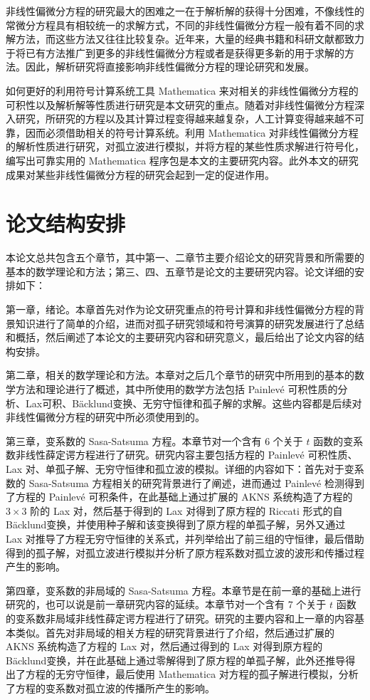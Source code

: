 非线性偏微分方程的研究最大的困难之一在于解析解的获得十分困难，不像线性的常微分方程具有相较统一的求解方式，不同的非线性偏微分方程一般有着不同的求解方法，而这些方法又往往比较复杂。近年来，大量的经典书籍和科研文献都致力于将已有方法推广到更多的非线性偏微分方程或者是获得更多新的用于求解的方法。因此，解析研究将直接影响非线性偏微分方程的理论研究和发展。

如何更好的利用符号计算系统工具 Mathematica 来对相关的非线性偏微分方程的可积性以及解析解等性质进行研究是本文研究的重点。随着对非线性偏微分方程深入研究，所研究的方程以及其计算过程变得越来越复杂，人工计算变得越来越不可靠，因而必须借助相关的符号计算系统。利用 Mathematica 对非线性偏微分方程的解析性质进行研究，对孤立波进行模拟，并将方程的某些性质求解进行符号化，编写出可靠实用的 Mathematica 程序包是本文的主要研究内容。此外本文的研究成果对某些非线性偏微分方程的研究会起到一定的促进作用。

\section{论文结构安排}
本论文总共包含五个章节，其中第一、二章节主要介绍论文的研究背景和所需要的基本的数学理论和方法；第三、四、五章节是论文的主要研究内容。论文详细的安排如下：

第一章，绪论。本章首先对作为论文研究重点的符号计算和非线性偏微分方程的背景知识进行了简单的介绍，进而对孤子研究领域和符号演算的研究发展进行了总结和概括，然后阐述了本论文的主要研究内容和研究意义，最后给出了论文内容的结构安排。

第二章，相关的数学理论和方法。本章对之后几个章节的研究中所用到的基本的数学方法和理论进行了概述，其中所使用的数学方法包括 Painlev\'{e} 可积性质的分析、Lax可积、B\"{a}cklund变换、无穷守恒律和孤子解的求解。这些内容都是后续对非线性偏微分方程的研究中所必须使用到的。

第三章，变系数的 Sasa-Satsuma 方程。本章节对一个含有 6 个关于 $t$ 函数的变系数非线性薛定谔方程进行了研究。研究内容主要包括方程的 Painlev\'{e} 可积性质、Lax 对、单孤子解、无穷守恒律和孤立波的模拟。详细的内容如下：首先对于变系数的 Sasa-Satsuma 方程相关的研究背景进行了阐述，进而通过  Painlev\'{e} 检测得到了方程的  Painlev\'{e} 可积条件，在此基础上通过扩展的 AKNS 系统构造了方程的 $3 \times 3$ 阶的 Lax 对，然后基于得到的 Lax 对得到了原方程的 Riccati 形式的自 B\"{a}cklund变换，并使用种子解和该变换得到了原方程的单孤子解，另外又通过 Lax 对推导了方程无穷守恒律的关系式，并列举给出了前三组的守恒律，最后借助得到的孤子解，对孤立波进行模拟并分析了原方程系数对孤立波的波形和传播过程产生的影响。

第四章，变系数的非局域的 Sasa-Satsuma 方程。本章节是在前一章的基础上进行研究的，也可以说是前一章研究内容的延续。本章节对一个含有 7 个关于 $t$ 函数的变系数非局域非线性薛定谔方程进行了研究。研究的主要内容和上一章的内容基本类似。首先对非局域的相关方程的研究背景进行了介绍，然后通过扩展的 AKNS 系统构造了方程的 Lax 对，然后通过得到的 Lax 对得到原方程的 B\"{a}cklund变换，并在此基础上通过零解得到了原方程的单孤子解，此外还推导得出了方程的无穷守恒律，最后使用 Mathematica 对方程的孤子解进行模拟，分析了方程的变系数对孤立波的传播所产生的影响。


